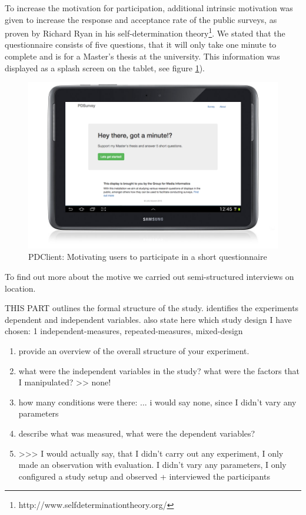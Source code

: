 	To increase the motivation for participation, additional intrinsic motivation was given to increase the response and acceptance rate of the public surveys, as proven by Richard Ryan in his self-determination theory\cite{ryan2000self}\footnote{http://www.selfdeterminationtheory.org/}. We stated that the questionnaire consists of five questions, that it will only take one minute to complete and is for a Master's thesis at the university. This information was displayed as a splash screen on the tablet, see figure \ref{fig:5-pdclient-intro}).


	\begin{figure}
	    \begin{center}
	        \includegraphics[width=.7\columnwidth]{img/5_field-study/pdclient-startscreen.png}
	    \end{center}
	 \caption{PDClient: Motivating users to participate in a short questionnaire}
	 \label{fig:5-pdclient-intro}
	\end{figure}

	To find out more about the motive we carried out semi-structured interviews on location.

	THIS PART outlines the formal structure of the study. identifies the experiments dependent and independent variables.
	also state here which study design I have chosen: 1 independent-measures, repeated-measures, mixed-design

		\begin{enumerate}
		\item provide an overview of the overall structure of your experiment. 
		\item what were the independent variables in the study? what were the factors that I manipulated? >> none! 
		\item how many conditions were there: ... i would say none, since I didn't vary any parameters
		\item describe what was measured, what were the dependent variables?
		\item >>> I would actually say, that I didn't carry out any experiment, I only made an observation with evaluation. I didn't vary any parameters, I only configured a study setup and observed + interviewed the participants
		\end{enumerate}


